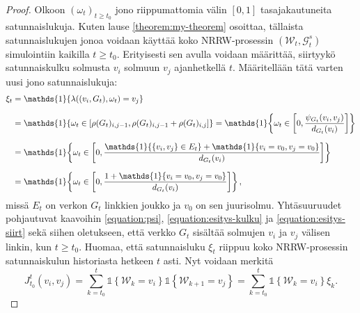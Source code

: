 \documentclass[finnish, 12pt, a4paper, sci, utf8, pdfa]{aaltothesis}
\newcommand{\Grandom}{\mathcal{G}}
\newcommand{\Wrandom}{\mathcal{W}}
\newcommand{\indicator}{\mathopen{\mathds{1}}}
\begin{document}
\begin{proof}
   Olkoon $ (\omega_{t})_{t \geq t_{0}} $ jono riippumattomia välin $ [0, 1] $ tasajakautuneita satunnaislukuja. Kuten lause \ref{theorem:my-theorem} osoittaa, tällaista satunnaislukujen
   jonoa voidaan käyttää koko NRRW-prosessin $ (\Wrandom_{t}, \Grandom_{t}^{s}) $ simulointiin kaikilla $ t \geq t_{0} $. Erityisesti sen avulla voidaan määrittää, siirtyykö satunnaiskulku
   solmusta $ v_{i} $ solmuun $ v_{j} $ ajanhetkellä $ t $. Määritellään tätä varten uusi jono satunnaislukuja:
   \begin{equation*}
      \setlength{\jot}{10pt}
      \begin{aligned}
      \xi_{t} &= \indicator \left\{ \lambda((v_{i}, G_{t}), \omega_{t}) = v_{j} \right\} \\
              &= \indicator \left\{ \omega_{t} \in \left[ \rho(G_{t})_{i,j-1}, \rho(G_{t})_{i,j-1} + \rho(G_{t})_{i,j} \right] \right\}
               = \indicator \left\{ \omega_{t} \in \left[ 0, \frac{\psi_{G_{t}}(v_{i}, v_{j})}{d_{G_{t}}(v_{i})} \right] \right\} \\
              &= \indicator \left\{ \omega_{t} \in \left[ 0, \frac{\indicator \left\{ \left\{ v_{i}, v_{j} \right\} \in E_{t} \right\} + \indicator \{ v_{i} = v_{0}, v_{j} = v_{0} \}}{d_{G_{t}}(v_{i})} \right] \right\} \\
              &= \indicator \left\{ \omega_{t} \in \left[ 0, \frac{1 + \indicator \{ v_{i} = v_{0}, v_{j} = v_{0} \}}{d_{G_{t}}(v_{i})} \right] \right\},
      \end{aligned}
   \end{equation*}
   missä $ E_{t} $ on verkon $ G_{t} $ linkkien joukko ja $ v_{0} $ on sen juurisolmu. Yhtäsuuruudet pohjautuvat kaavoihin \ref{equation:psi}, \ref{equation:esitys-kulku} ja \ref{equation:esitys-siirt} sekä siihen oletukseen, että verkko $ G_{t} $ sisältää solmujen $ v_{i} $ ja $ v_{j} $ välisen linkin, kun $ t \geq t_{0} $. Huomaa, että satunnaisluku
   $ \xi_{t} $ riippuu koko NRRW-prosessin satunnaiskulun historiasta hetkeen $ t $ asti. Nyt voidaan merkitä
   \[
      J_{t_{0}}^{t}(v_{i}, v_{j}) = \sum_{k = t_{0}}^{t} \indicator \left\{ \Wrandom_{k} = v_{i} \right\} \indicator \left\{ \Wrandom_{k+1} = v_{j} \right\} 
      = \sum_{k = t_{0}}^{t} \indicator \left\{ \Wrandom_{k} = v_{i} \right\} \xi_{k}.
   \]


\end{proof}
\end{document}

